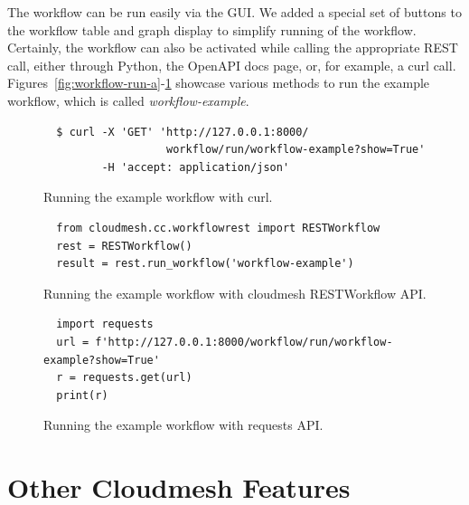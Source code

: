 \documentclass[sigplan,screen]{acmart}
\newcommand{\FILE}[1]{}
\begin{document}
The workflow can be run easily via the GUI. We added a special set of
buttons to the workflow table and graph display to simplify running of
the workflow. Certainly, the workflow can also be activated while
calling the appropriate REST call, either through Python, the OpenAPI
docs page, or, for example, a curl call.
Figures~\ref{fig:workflow-run-a}-\ref{fig:workflow-run-c}
showcase various methods to run the example workflow, which is called
{\em workflow-example}.


\begin{figure}[htb]

{\scriptsize\begin{verbatim}
  $ curl -X 'GET' 'http://127.0.0.1:8000/
                   workflow/run/workflow-example?show=True'
         -H 'accept: application/json'
\end{verbatim}}%

\caption{Running the example workflow with curl.}
\label{fig:workflow-run-a}
\bigskip

{\scriptsize\begin{verbatim}
  from cloudmesh.cc.workflowrest import RESTWorkflow
  rest = RESTWorkflow()
  result = rest.run_workflow('workflow-example')
\end{verbatim}}

\caption{Running the example workflow with cloudmesh RESTWorkflow API.}
\label{fig:workflow-run-b}
\bigskip

{\scriptsize\begin{verbatim}
  import requests
  url = f'http://127.0.0.1:8000/workflow/run/workflow-example?show=True'
  r = requests.get(url)
  print(r)
\end{verbatim}}

\caption{Running the example workflow with requests API.}
\label{fig:workflow-run-c}

\end{figure}









% 

\FILE{cloudmesh.tex}

\section{Other Cloudmesh Features}
\end{document}
